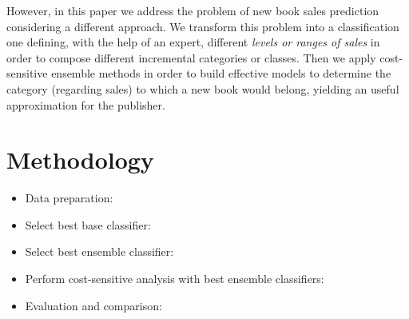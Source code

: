 \documentclass[a4paper,10pt,onecolumn,preprint,3p]{elsarticle}
\begin{document}
However, in this paper we address the problem of new book sales prediction considering a different approach. We transform this problem into a classification one defining, with the help of an expert, different \textit{levels or ranges of sales} in order to compose different incremental categories or classes. Then we apply cost-sensitive ensemble methods in order to build effective models to determine the category (regarding sales) to which a new book would belong, yielding an useful approximation for the publisher.


\section{Methodology}
\label{sec:methodology}


\begin{itemize}
\item Data preparation:

\item Select best base classifier:

\item Select best ensemble classifier:

\item Perform cost-sensitive analysis with best ensemble classifiers:

\item Evaluation and comparison:


\end{itemize}
\end{document}
